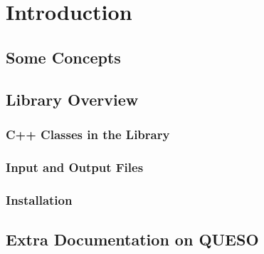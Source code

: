\chapter{Introduction}\label{ch-int}
\thispagestyle{headings}


\section{Some Concepts}

\section{Library Overview}

\subsection{C++ Classes in the Library}

\subsection{Input and Output Files}

\subsection{Installation}

\section{Extra Documentation on QUESO}

